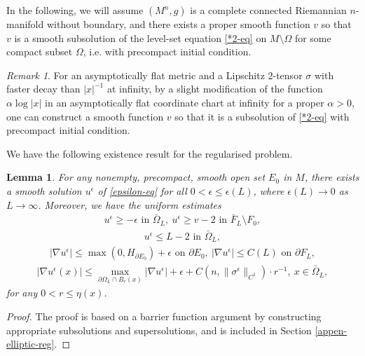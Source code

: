 \documentclass[11pt, letterpaper]{amsart}
\newtheorem{lem}[thm]{Lemma}
\theoremstyle{definition}
\theoremstyle{remark}
\newtheorem{rmk}{Remark}[section]
\begin{document}
In the following, we will assume $(M^{n},g)$ is a complete connected Riemannian $n$-manifold without boundary, and there exists a proper smooth function $v$ so that $v$ is a smooth subsolution of the level-set equation \ref{*2-eq} on $M \setminus \Omega $ for some compact subset $\Omega $, i.e. with precompact initial condition. 
\begin{rmk}\label{rmk-subsolution}
	For an asymptotically flat metric and a Lipschitz $2$-tensor $\sigma $ with faster decay than $|x| ^{-1}$ at infinity, by a slight modification of the function $\alpha \log|x|$ in an asymptotically flat coordinate chart at infinity for a proper $\alpha >0$, one can construct a smooth function $v$ so that it is a subsolution of \ref{*2-eq} with precompact initial condition.
\end{rmk}

We have the following existence result for the regularised problem.
\begin{lem}\label{smooth-sol-*-epsilon}
	For any nonempty, precompact, smooth open set $E_0$ in $M$, there exists a smooth solution $u ^{\epsilon }$ of \ref{epsilon-eq} for all $0<\epsilon \leq \epsilon (L)$, where $ \epsilon (L) \to 0$ as $L\to \infty$. Moreover, we have the uniform estimates 
	\begin{align*}
		u ^{\epsilon } \geq - \epsilon \text{ in } \bar{\Omega }_{L},\ u ^{\epsilon } \geq v - 2 \text{ in } \bar{F}_{L} \setminus F_0,
	\end{align*} 
	\begin{align*}
		u ^{\epsilon } \leq L-2 \text{ in } \bar{\Omega }_{L},
	\end{align*} 
	\begin{align*}
		|\nabla u ^{\epsilon }| \leq \max(0, H_{\partial E_0}) + \epsilon \text{ on } \partial E_0,\ |\nabla u^{\epsilon }| \leq C(L) \text{ on } \partial F_L,
	\end{align*}
	\begin{align*}
		|\nabla u^{\epsilon }(x)| \leq \max_{\partial \Omega _{L} \cap B_r(x)} |\nabla u^{\epsilon }| + \epsilon + C(n, \|\sigma^{\epsilon } \|_{C^1})\cdot r ^{-1},\ x \in \bar{\Omega }_{L},
	\end{align*} 
	for any $0<r \leq \eta (x)$.
\end{lem}
\begin{proof}
	The proof is based on a barrier function argument by constructing appropriate subsolutions and supersolutions, and is included in Section \ref{appen-elliptic-reg}.
\end{proof}
\end{document}
